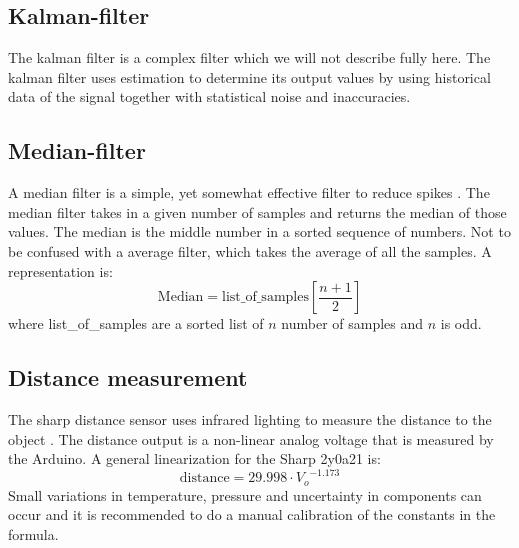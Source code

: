 \subsection{Kalman-filter}
The kalman filter is a complex filter which we will not describe fully here. The kalman filter uses estimation to determine its output values by using historical data of the signal together with statistical noise and inaccuracies. 
\cite{Kalman-filter}


\subsection{Median-filter}
A median filter is a simple, yet somewhat effective filter to reduce spikes \cite{Median-library}. The median filter takes in a given number of samples and returns the median of those values. The median is the middle number in a sorted sequence of numbers. Not to be confused with a average filter, which takes the average of all the samples.
A representation is:
\begin{equation}
    \label{eq:median}
    \textrm{Median} = \textrm{list\_of\_samples} [\frac{n+1}{2}]
\end{equation}
where list\_of\_samples are a sorted list of $n$ number of samples and $n$ is odd.


\subsection{Distance measurement}
The sharp distance sensor uses infrared lighting to measure the distance to the object \cite{Sharp-datasheet}. The distance output is a non-linear analog voltage that is measured by the Arduino. A general linearization for the Sharp 2y0a21 is:
\begin{equation}
    \label{sharp-linear}
    \textrm{distance} = 29.998 \cdot {V_o}^{-1.173}
\end{equation}
Small variations in temperature, pressure and uncertainty in components can occur and it is recommended to do a manual calibration of the constants in the formula.
